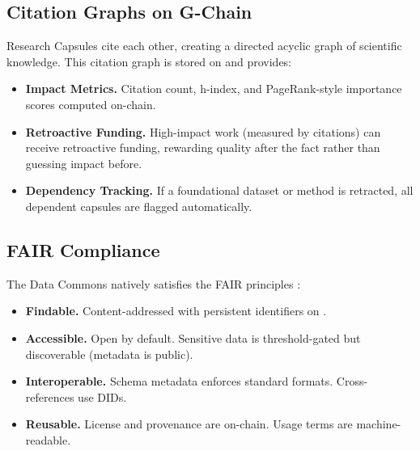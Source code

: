 \subsection{Citation Graphs on G-Chain}

Research Capsules cite each other, creating a directed acyclic graph of scientific knowledge. This citation graph is stored on \GChain{} and provides:

\begin{itemize}
    \item \textbf{Impact Metrics.} Citation count, h-index, and PageRank-style importance scores computed on-chain.
    \item \textbf{Retroactive Funding.} High-impact work (measured by citations) can receive retroactive \DAO{} funding, rewarding quality after the fact rather than guessing impact before.
    \item \textbf{Dependency Tracking.} If a foundational dataset or method is retracted, all dependent capsules are flagged automatically.
\end{itemize}

\subsection{FAIR Compliance}

The Data Commons natively satisfies the FAIR principles \cite{wilkinson2016fair}:

\begin{itemize}
    \item \textbf{Findable.} Content-addressed with persistent identifiers on \IChain{}.
    \item \textbf{Accessible.} Open by default. Sensitive data is threshold-gated but discoverable (metadata is public).
    \item \textbf{Interoperable.} Schema metadata enforces standard formats. Cross-references use DIDs.
    \item \textbf{Reusable.} License and provenance are on-chain. Usage terms are machine-readable.
\end{itemize}

